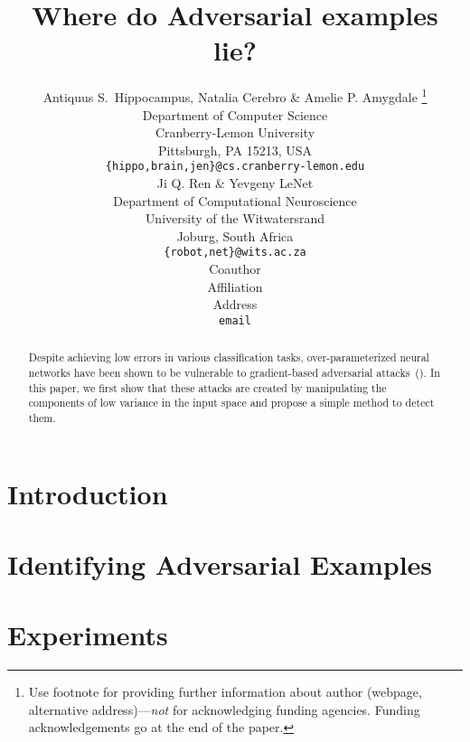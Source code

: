 \documentclass[a4paper]{article}
\title{Where do Adversarial examples lie?}
\author{Antiquus S.~Hippocampus, Natalia Cerebro \& Amelie P. Amygdale \thanks{ Use footnote for providing further information
about author (webpage, alternative address)---\emph{not} for acknowledging
funding agencies.  Funding acknowledgements go at the end of the paper.} \\
Department of Computer Science\\
Cranberry-Lemon University\\
Pittsburgh, PA 15213, USA \\
\texttt{\{hippo,brain,jen\}@cs.cranberry-lemon.edu} \\
\And
Ji Q. Ren \& Yevgeny LeNet \\
Department of Computational Neuroscience \\
University of the Witwatersrand \\
Joburg, South Africa \\
\texttt{\{robot,net\}@wits.ac.za} \\
\AND
Coauthor \\
Affiliation \\
Address \\
\texttt{email}
}
\begin{document}
\maketitle

\begin{abstract}
    Despite achieving low errors in various classification tasks,
    over-parameterized neural networks have been shown to be vulnerable to
    gradient-based adversarial attacks~(\citet{szegedy2013intriguing}). In this paper, we first show that these
    attacks are created by manipulating the components of low variance in the
    input space and propose a simple method to detect them.
\end{abstract}

\section{Introduction}
\label{sec:intro}


\section{Identifying Adversarial Examples}
\label{sec:ident}


\section{Experiments}
\label{sec:experiments}



\end{document}

